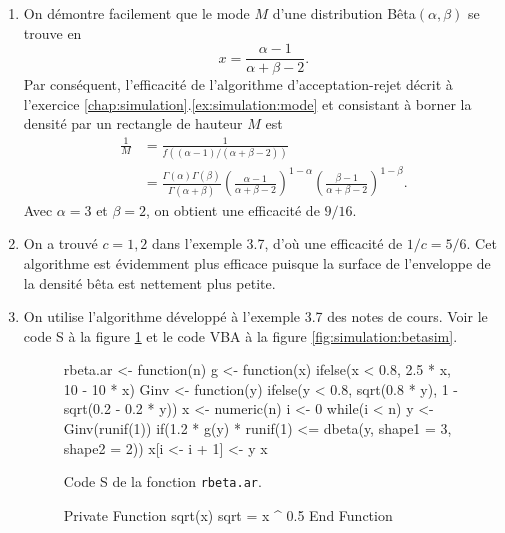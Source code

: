 \begin{exercice}
\begin{sol}
    \begin{enumerate}
    \item On démontre facilement que le mode $M$ d'une distribution
      Bêta$(\alpha, \beta)$ se trouve en
      \begin{displaymath}
        x = \frac{\alpha - 1}{\alpha + \beta - 2}.
      \end{displaymath}
      Par conséquent, l'efficacité de l'algorithme d'acceptation-rejet
      décrit à l'exercice
      \ref{chap:simulation}.\ref{ex:simulation:mode} et consistant à
      borner la densité par un rectangle de hauteur $M$ est
      \begin{align*}
        \frac{1}{M}
        &= \frac{1}{f((\alpha - 1)/(\alpha + \beta - 2))} \\
        &= \frac{\Gamma(\alpha) \Gamma(\beta)}{\Gamma(\alpha + \beta)}
        \left(
          \frac{\alpha - 1}{\alpha + \beta - 2}
        \right)^{1 - \alpha}
        \left(
          \frac{\beta - 1}{\alpha + \beta - 2}
        \right)^{1 - \beta}.
      \end{align*}
      Avec $\alpha = 3$ et $\beta = 2$, on obtient une efficacité de
      $9/16$.
    \item On a trouvé $c = 1,2$ dans l'exemple 3.7, d'où une
      efficacité de $1/c = 5/6$. Cet algorithme est évidemment plus
      efficace puisque la surface de l'enveloppe de la densité bêta
      est nettement plus petite.
    \item On utilise l'algorithme développé à l'exemple 3.7 des notes
      de cours. Voir le code S à la figure
      \ref{fig:simulation:rbeta.ar} et le code VBA à la figure
      \ref{fig:simulation:betasim}.
      \begin{figure}[t]
        \centering
        \begin{framed}
\begin{Scode}
rbeta.ar <- function(n)
{
    g <- function(x)
        ifelse(x < 0.8, 2.5 * x, 10 - 10 * x)
    Ginv <- function(y)
        ifelse(y < 0.8, sqrt(0.8 * y),
               1 - sqrt(0.2 - 0.2 * y))
    x <- numeric(n)
    i <- 0
    while(i < n)
    {
        y <- Ginv(runif(1))
        if(1.2 * g(y) * runif(1) <=
           dbeta(y, shape1 = 3, shape2 = 2))
            x[i <- i + 1] <- y
    }
    x
}
\end{Scode}
        \end{framed}
        \caption{Code S de la fonction \texttt{rbeta.ar}.}
        \label{fig:simulation:rbeta.ar}
      \end{figure}
      \begin{figure}
        \centering
        \begin{framed}
\begin{Scode}
Private Function sqrt(x)
    sqrt = x ^ 0.5
End Function


\end{Scode}
\end{framed}
\end{figure}
\end{enumerate}
\end{sol}
\end{exercice}

